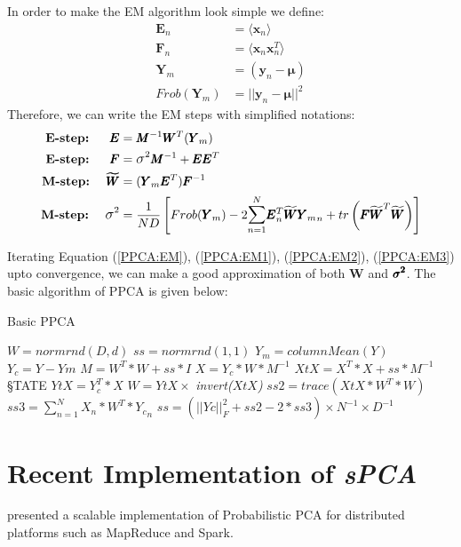 In order to make the EM algorithm look simple we define:
\begin{align*}
\pmb{E}_n &= \langle \pmb{x}_n \rangle\\
\pmb{F}_n &= \langle \pmb{x}_n\pmb{x}_n^T \rangle\\
\pmb{Y}_m &= (\pmb{y}_n - \pmb{\mu})\\
{Frob(\pmb{Y}_m)} &= || \pmb{y}_n - \pmb{\mu} ||^2
\end{align*}
Therefore, we can write the EM steps with simplified notations:
\begin{align*}
\text{\textbf{E-step:}} \ \ \ \ \  \pmb{E} &= \pmb{M}^{-1}\pmb{W}^T(\pmb{Y}_{m}) \\
\text{\textbf{E-step:}} \ \ \ \ \  \pmb{F} &= \mathlarger{\sigma}^2\pmb{M}^{-1}+ \pmb{E}\pmb{E}^T\\
\text{\textbf{M-step:}} \ \ \ \  \pmb{\widetilde{W}} &= (\pmb{Y}_m\pmb{E}^T)\pmb{F}^{-1} \\
\text{\textbf{M-step:}} \ \ \ \ \mathlarger{\sigma}^2 &= \dfrac{1}{ND} \left[    Frob(\pmb{Y}_m) - 2 \mathlarger{\sum}^N_{n=1} \pmb{E}_n^T \widetilde{\pmb{W}}{\pmb{Y}_m}_n + tr \left(\pmb{F} \widetilde{\pmb{W}}^T\widetilde{\pmb{W}}  \right) \right]
\end{align*}

Iterating Equation (\ref{PPCA:EM}), (\ref{PPCA:EM1}), (\ref{PPCA:EM2}), (\ref{PPCA:EM3}) upto convergence, we can make a good approximation of both $\pmb{W}$ and $\pmb{\mathlarger{\sigma}^2}$.
The basic algorithm of PPCA is given below:

\begin{algorithm}[!htbp]
\caption{Basic PPCA}
\begin{algorithmic}[1]
	\STATE $W = normrnd(D,d)$
	\STATE $ss=normrnd(1,1)$
	\STATE $Y_m=columnMean(Y)$
	\STATE  $Y_c=Y-Ym$
		\STATE $M = W^T * W + ss * I$
		\STATE $X = Y_c * W * M^{-1}$
		\STATE $XtX = X^T * X + ss * M^{-1}$
		\S	TATE $YtX = Y_c^T * X$
		\STATE $W = YtX \times$ \textit{invert($XtX$)}
		\STATE $ss2 = trace(XtX * W^T * W)$
		\STATE $ss3= \sum_{n=1}^N X_n * W^T * {Y_c}_n$
		\STATE $ss = (||Y c||^2_F + ss2-2 * ss3)\times N^{-1} \times D^{-1}$
	\ENDWHILE
\label{basic}
\end{algorithmic}
\end{algorithm}

 
\section{Recent Implementation of \textit{sPCA}}
\cite{elgamal} presented a  scalable implementation of Probabilistic PCA for distributed platforms such as MapReduce and Spark. 
